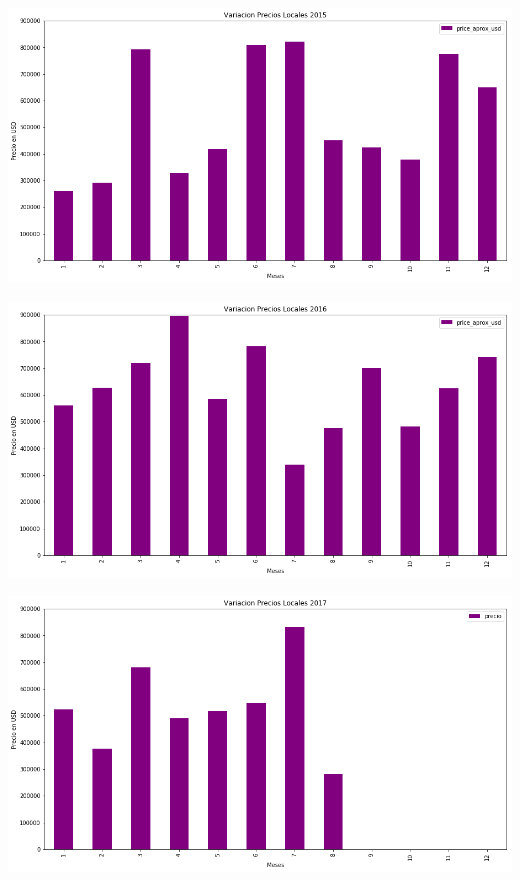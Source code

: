 \documentclass[a4paper, 10pt]{article}
\begin{document}
			\begin{center}
   		    		\includegraphics[width=\textwidth]{images/vLoc2015}
			\end{center}

			\begin{center}
   		    		\includegraphics[width=\textwidth]{images/vLoc2016}
			\end{center}

			\begin{center}
   		    		\includegraphics[width=\textwidth]{images/vLoc2017}
			\end{center}
\end{document}

